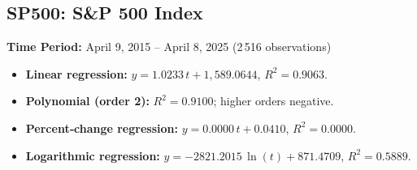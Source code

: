 \documentclass[11pt,a4paper]{article}
\begin{document}
\clearpage
\subsection{SP500: S\&P 500 Index}
\textbf{Time Period:} April 9, 2015 – April 8, 2025 (2\,516 observations)

\begin{itemize}
  \item \textbf{Linear regression:} \(y = 1.0233\,t + 1{,}589.0644\), \(R^2 = 0.9063\).
  \item \textbf{Polynomial (order 2):} \(R^2 = 0.9100\); higher orders negative.
  \item \textbf{Percent‐change regression:} \(y = 0.0000\,t + 0.0410\), \(R^2 = 0.0000\).
  \item \textbf{Logarithmic regression:} \(y = -2821.2015\,\ln(t) + 871.4709\), \(R^2 = 0.5889\).
\end{itemize}
\end{document}
